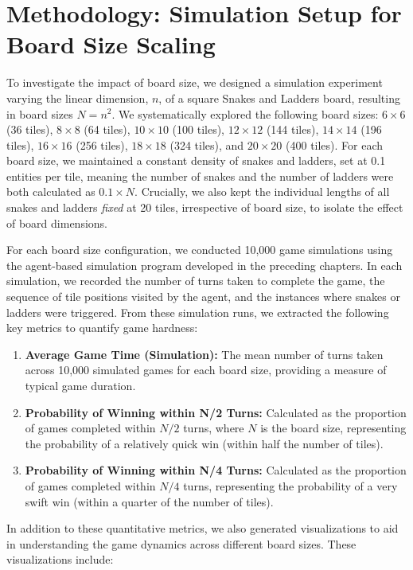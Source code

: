 \section{Methodology: Simulation Setup for Board Size Scaling}

To investigate the impact of board size, we designed a simulation experiment varying the linear dimension, $n$, of a square Snakes and Ladders board, resulting in board sizes $N = n^2$. We systematically explored the following board sizes: $6 \times 6$ (36 tiles), $8 \times 8$ (64 tiles), $10 \times 10$ (100 tiles), $12 \times 12$ (144 tiles), $14 \times 14$ (196 tiles), $16 \times 16$ (256 tiles), $18 \times 18$ (324 tiles), and $20 \times 20$ (400 tiles).  For each board size, we maintained a constant density of snakes and ladders, set at 0.1 entities per tile, meaning the number of snakes and the number of ladders were both calculated as $0.1 \times N$.  Crucially, we also kept the individual lengths of all snakes and ladders \textit{fixed} at 20 tiles, irrespective of board size, to isolate the effect of board dimensions.

For each board size configuration, we conducted 10,000 game simulations using the agent-based simulation program developed in the preceding chapters. In each simulation, we recorded the number of turns taken to complete the game, the sequence of tile positions visited by the agent, and the instances where snakes or ladders were triggered. From these simulation runs, we extracted the following key metrics to quantify game hardness:

\begin{enumerate}
	\item \textbf{Average Game Time (Simulation):}  The mean number of turns taken across 10,000 simulated games for each board size, providing a measure of typical game duration.
	\item \textbf{Probability of Winning within N/2 Turns:} Calculated as the proportion of games completed within $N/2$ turns, where $N$ is the board size, representing the probability of a relatively quick win (within half the number of tiles).
	\item \textbf{Probability of Winning within N/4 Turns:}  Calculated as the proportion of games completed within $N/4$ turns, representing the probability of a very swift win (within a quarter of the number of tiles).
\end{enumerate}

In addition to these quantitative metrics, we also generated visualizations to aid in understanding the game dynamics across different board sizes. These visualizations include:

